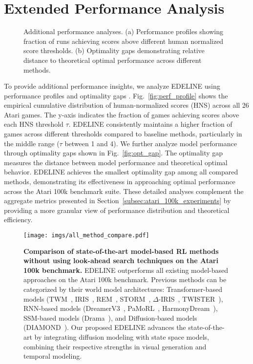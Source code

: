 \section{Extended Performance Analysis}
\label{appendix:atari_100k_additional}
\begin{figure}[h]
\centering
{}
\caption{Additional performance analyses. (a) Performance profiles showing fraction of runs achieving scores above different human normalized score thresholds. (b) Optimality gaps demonstrating relative distance to theoretical optimal performance across different methods.}
\label{fig:extended_analysis}
\end{figure}

To provide additional performance insights, we analyze EDELINE using performance profiles and optimality gaps \cite{agarwal2021deep}. Fig.~\ref{fig:perf_profile} shows the empirical cumulative distribution of human-normalized scores (HNS) across all 26 Atari games. The y-axis indicates the fraction of games achieving scores above each HNS threshold $\tau$. EDELINE consistently maintains a higher fraction of games across different thresholds compared to baseline methods, particularly in the middle range ($\tau$ between 1 and 4).
We further analyze model performance through optimality gaps shown in Fig.~\ref{fig:opt_gap}. The optimality gap measures the distance between model performance and theoretical optimal behavior. EDELINE achieves the smallest optimality gap among all compared methods, demonstrating its effectiveness in approaching optimal performance across the Atari 100k benchmark suite.
These detailed analyses complement the aggregate metrics presented in Section~\ref{subsec:atari_100k_experiments} by providing a more granular view of performance distribution and theoretical efficiency.

\begin{figure*}[h]
\centering
\texttt{[image: imgs/all\_method\_compare.pdf]}
\label{fig:all_cmp}
\vspace{-2em}
\caption{\textbf{Comparison of state-of-the-art model-based RL methods without using look-ahead search techniques on the Atari 100k benchmark.} EDELINE outperforms all existing model-based approaches on the Atari 100k benchmark. Previous methods can be categorized by their world model architectures: Transformer-based models (TWM~\cite{robine2023TWM}, IRIS~\cite{micheli2023iris}, REM~\cite{cohen2024rem}, STORM~\cite{zhang2023storm}, $\Delta$-IRIS~\cite{alonso2023delta-iris}, TWISTER~\cite{anonymous2025twister}), RNN-based models (DreamerV3~\cite{hafner2024DreamerV3}, PaMoRL~\cite{wang2024pamorl}, HarmonyDream~\cite{ma2024harmonydream}), SSM-based models (Drama~\cite{anonymous2025drama}), and Diffusion-based models (DIAMOND~\cite{alonso2024diamond}). Our proposed EDELINE advances the state-of-the-art by integrating diffusion modeling with state space models, combining their respective strengths in visual generation and temporal modeling.} 
\end{figure*}
